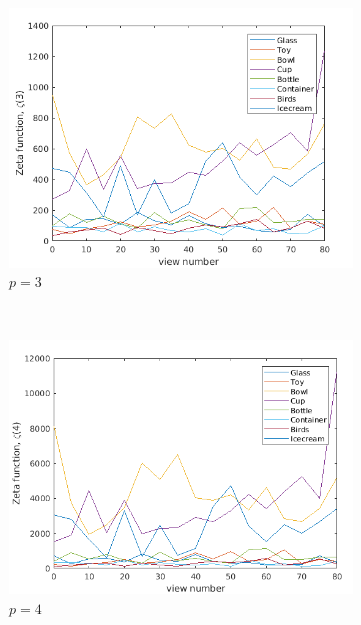 \documentclass[10pt,a4paper]{article}
\begin{document}
\begin{figure}[H]
	\begin{subfigure}[b]{0.5\textwidth}
		\includegraphics[width= \textwidth]{images/zeta-viewnump3.png}
		\caption{$p=3$}
		\label{}
	\end{subfigure}~
	\begin{subfigure}[b]{0.5\textwidth}
		\includegraphics[width= \textwidth]{images/zeta-viewnump4.png}
		\caption{$p=4$}
		\label{}
	\end{subfigure}
	\caption{ }
	\label{}
\end{figure}
\end{document}
